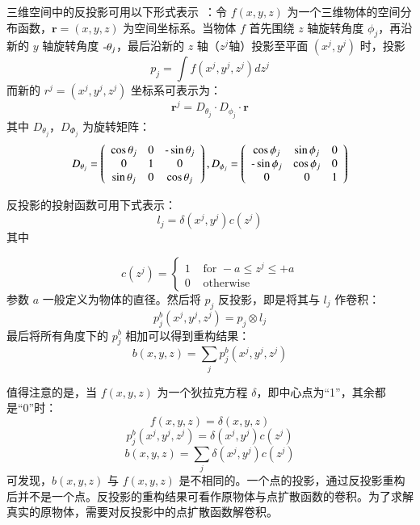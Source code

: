 三维空间中的反投影可用以下形式表示~\cite{Frank2006}：令 $f(x,y,z)$ 为一个三维物体的空间分布函数，$\boldsymbol{r}=(x,y,z)$ 为空间坐标系。当物体 $f$ 首先围绕 $z$ 轴旋转角度 $\phi_j$，再沿新的 $y$ 轴旋转角度 $\textnormal{-}\theta_j$，最后沿新的 $z$ 轴（$z^j$轴）投影至平面 $(x^j,y^j )$ 时，投影
\begin{equation}
p_j=\int f(x^j,y^j,z^j)dz^j
\end{equation}
而新的 $r^j=(x^j,y^j,z^j )$ 坐标系可表示为：
\begin{equation}
\boldsymbol{r}^j=D_{\theta_j}\cdot D_{\phi_j} \cdot \boldsymbol{r}
\end{equation}
其中 $D_{\theta_j}$，$D_{\Phi_j}$ 为旋转矩阵：
\begin{equation}D_{\theta_{j}}=\left(\begin{array}{ccc}
\cos \theta_{j} & 0 & \textnormal{-}\sin \theta_{j} \\
0 & 1 & 0 \\
\sin \theta_{j} & 0 & \cos \theta_{j}
\end{array}\right), D_{\phi_{j}}=\left(\begin{array}{ccc}
\cos \phi_{j} & \sin \phi_{j} & 0 \\
\textnormal{-}\sin \phi_{j} & \cos \phi_{j} & 0 \\
0 & 0 & 1
\end{array}\right)\end{equation}



反投影的投射函数可用下式表示：
\begin{equation}
l_j=\delta(x^j,y^j)c(z^j)
\end{equation}
其中

\begin{equation}c(z^j)=\left\{\begin{array}{cc}
1 & \text { for }-a \leq z^{j} \leq+a \\
0 & \text { otherwise }
\end{array}\right.\end{equation}
参数 $a$ 一般定义为物体的直径。然后将 $p_j$ 反投影，即是将其与 $l_j$ 作卷积：
\begin{equation}
p_j^b(x^j,y^j,z^j)=p_j \otimes l_j
\end{equation}
最后将所有角度下的 $p_j^b$ 相加可以得到重构结果：
\begin{equation}
b(x,y,z)=\sum_j p_j^b (x^j, y^j, z^j)
\end{equation}

值得注意的是，当 $f(x,y,z)$ 为一个狄拉克方程 $\delta$，即中心点为“1”，其余都是“0”时：
\begin{equation}
f(x,y,z) = \delta (x,y,z)
\end{equation}
\begin{equation}
p_j^b(x^j,y^j,z^j)=\delta (x^j,y^j)c(z^j)
\end{equation}
\begin{equation}
b(x,y,z)=\sum_j \delta(x^j,y^j)c(z^j)
\end{equation}
可发现，$b(x,y,z)$ 与 $f(x,y,z)$ 是不相同的。一个点的投影，通过反投影重构后并不是一个点。反投影的重构结果可看作原物体与点扩散函数的卷积。为了求解真实的原物体，需要对反投影中的点扩散函数解卷积。

